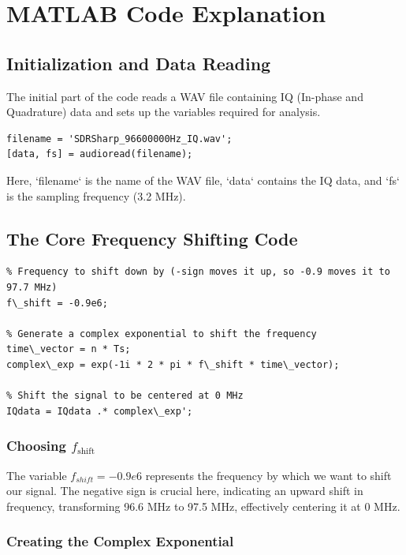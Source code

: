 \documentclass{article}
\begin{document}
\section*{MATLAB Code Explanation}

\subsection*{Initialization and Data Reading}

The initial part of the code reads a WAV file containing IQ (In-phase and Quadrature) data and sets up the variables required for analysis.

\begin{verbatim}
filename = 'SDRSharp_96600000Hz_IQ.wav';
[data, fs] = audioread(filename);
\end{verbatim}

Here, `filename` is the name of the WAV file, `data` contains the IQ data, and `fs` is the sampling frequency (3.2 MHz).

\subsection*{The Core Frequency Shifting Code}

\begin{verbatim}
% Frequency to shift down by (-sign moves it up, so -0.9 moves it to 97.7 MHz)
f\_shift = -0.9e6;

% Generate a complex exponential to shift the frequency
time\_vector = n * Ts;
complex\_exp = exp(-1i * 2 * pi * f\_shift * time\_vector);

% Shift the signal to be centered at 0 MHz
IQdata = IQdata .* complex\_exp';
\end{verbatim}

\subsubsection*{Choosing \( f_{\text{shift}} \)}

The variable \( f_{shift} = -0.9e6 \) represents the frequency by which we want to shift our signal. The negative sign is crucial here, indicating an upward shift in frequency, transforming 96.6 MHz to 97.5 MHz, effectively centering it at 0 MHz.

\subsubsection*{Creating the Complex Exponential}
\end{document}
